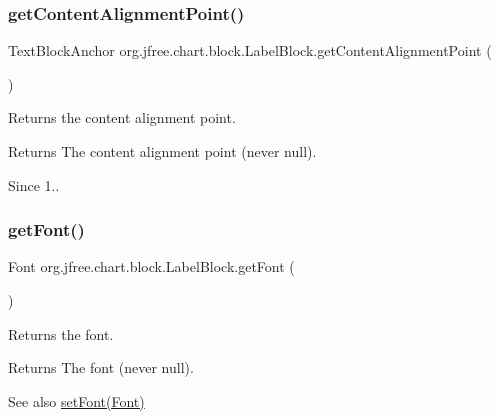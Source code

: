 \subsubsection{\texorpdfstring{get\+Content\+Alignment\+Point()}{getContentAlignmentPoint()}}
{\footnotesize\ttfamily Text\+Block\+Anchor org.\+jfree.\+chart.\+block.\+Label\+Block.\+get\+Content\+Alignment\+Point (\begin{DoxyParamCaption}{ }\end{DoxyParamCaption})}

Returns the content alignment point.

\begin{DoxyReturn}{Returns}
The content alignment point (never {\ttfamily null}).
\end{DoxyReturn}
\begin{DoxySince}{Since}
1.. 
\end{DoxySince}
\mbox{\label{classorg_1_1jfree_1_1chart_1_1block_1_1_label_block_acf755b9d091ab69faeca864cf7905874}} 
\subsubsection{\texorpdfstring{get\+Font()}{getFont()}}
{\footnotesize\ttfamily Font org.\+jfree.\+chart.\+block.\+Label\+Block.\+get\+Font (\begin{DoxyParamCaption}{ }\end{DoxyParamCaption})}

Returns the font.

\begin{DoxyReturn}{Returns}
The font (never {\ttfamily null}).
\end{DoxyReturn}
\begin{DoxySeeAlso}{See also}
\mbox{\hyperlink{classorg_1_1jfree_1_1chart_1_1block_1_1_label_block_ae22755a4ddcc038ac8bcc5f9be873824}{set\+Font(\+Font)}} 
\end{DoxySeeAlso}
\mbox{\label{classorg_1_1jfree_1_1chart_1_1block_1_1_label_block_abb777abf886b16519d0839e4b78ac8ba}} 

